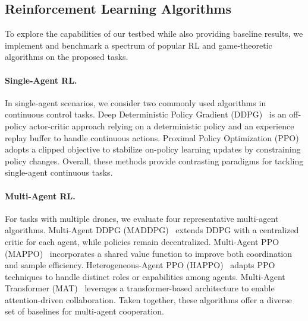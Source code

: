\subsection{Reinforcement Learning Algorithms}

To explore the capabilities of our testbed while also providing baseline results, we implement and benchmark a spectrum of popular RL and game-theoretic algorithms on the proposed tasks.

\paragraph{Single-Agent RL.}
In single-agent scenarios, we consider two commonly used algorithms in continuous control tasks. Deep Deterministic Policy Gradient (DDPG)~\cite{lillicrap2015continuous} is an off-policy actor-critic approach relying on a deterministic policy and an experience replay buffer to handle continuous actions. Proximal Policy Optimization (PPO)~\cite{schulman2017proximal} adopts a clipped objective to stabilize on-policy learning updates by constraining policy changes. 
Overall, these methods provide contrasting paradigms for tackling single-agent continuous tasks.

\paragraph{Multi-Agent RL.}
For tasks with multiple drones, we evaluate four representative multi-agent algorithms. Multi-Agent DDPG (MADDPG)~\cite{lowe2017multi} extends DDPG with a centralized critic for each agent, while policies remain decentralized. Multi-Agent PPO (MAPPO)~\cite{yu2022surprising} incorporates a shared value function to improve both coordination and sample efficiency. Heterogeneous-Agent PPO (HAPPO)~\cite{kuba2021trust} adapts PPO techniques to handle distinct roles or capabilities among agents. Multi-Agent Transformer (MAT)~\cite{wen2022multi} leverages a transformer-based architecture to enable attention-driven collaboration. Taken together, these algorithms offer a diverse set of baselines for multi-agent cooperation.

